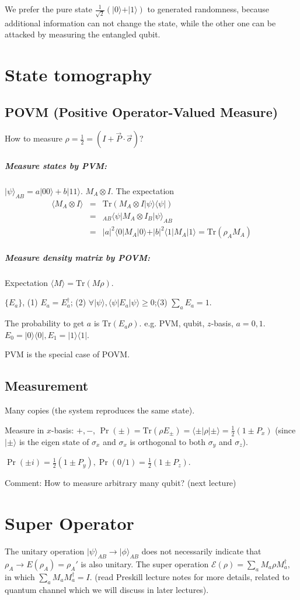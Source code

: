\documentclass{article}
\newcommand{\Tr}{\mathrm{Tr}}
\begin{document}
\begin{spacing}{1.2}
We prefer the pure state $\frac{1}{\sqrt2}(\vert 0\rangle+\vert 1\rangle)$ to generated randomness, because additional information can not change the state, while the other one can be attacked by measuring the entangled qubit.

\section{State tomography}

\subsection{POVM (Positive Operator-Valued Measure)}
How to measure $\rho = \frac12 = (I+\vec{P}\cdot\vec{\sigma})$?
\subparagraph{Measure states by PVM:}
$\vert\psi\rangle_{AB} = a\vert 00\rangle+b\vert11\rangle$. $M_A\otimes I$. 
The expectation 
\begin{eqnarray*}
\langle M_A\otimes I\rangle &= &\Tr(M_A\otimes I \vert \psi\rangle \langle\psi\vert) \\
&=& _{AB}\langle\psi\vert M_A\otimes I_B\vert \psi\rangle_{AB} \\
&=&\vert a\vert^2 \langle 0\vert M_A\vert 0\rangle +\vert b\vert^2 \langle 1\vert M_A\vert 1\rangle = \Tr(\rho_A M_A)
\end{eqnarray*}
\subparagraph{Measure density matrix by POVM:}
Expectation $\langle M\rangle = \Tr(M\rho)$.

$\{E_a\}$, (1) $E_a = E_a^\dagger$; (2) $\forall \vert\psi\rangle, \langle\psi\vert E_a\vert\psi\rangle\geq 0$;(3) $\sum_a E_a = 1$.

The probability to get $a$ is $\Tr(E_a\rho)$.
e.g. PVM, qubit, $z$-basis, $a = 0,1$. $E_0 = \vert 0\rangle\langle 0\vert , E_1 = \vert 1\rangle \langle1\vert$.

PVM is the special case of POVM.
\subsection{Measurement}
Many copies (the system reproduces the same state).

Measure in $x$-basis: $+, -$, $\Pr(\pm) = \Tr(\rho E_\pm) = \langle\pm\vert \rho\vert \pm\rangle = \frac12(1 \pm P_x)$ (since $\vert \pm \rangle$ is the eigen state of $\sigma_x$ and $\sigma_x$ is orthogonal to both $\sigma_y$ and $\sigma_z$).

$\Pr(\pm i) =  \frac12(1\pm P_y), \Pr(0/1) = \frac12(1\pm P_z)$.

Comment: How to measure arbitrary many qubit? (next lecture)


\section{Super Operator}
The unitary operation $\vert \psi\rangle_{AB}\to \vert \phi\rangle_{AB}$ does not necessarily indicate that $\rho_A\to E(\rho_A) = \rho_A'$ is also unitary.
The super operation $\mathcal{E}(\rho) = \sum_a M_a\rho M_a^\dagger,$ in which $\sum_a M_a M_a^\dagger=I$. (read Preskill lecture notes for more details, related to quantum channel which we will discuss in later lectures). 

\end{spacing}
\end{document}
